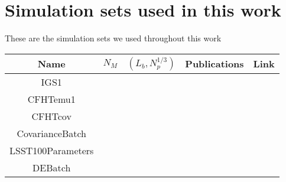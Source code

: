 \appendixpage
\noappendicestocpagenum
\addappheadtotoc

\chapter{Simulation sets used in this work}

These are the simulation sets we used throughout this work

\begin{table}
\begin{center}
\begin{tabular}[t]{c|c|c|c|c}

\textbf{Name} & $N_M$ & $(L_b,N_p^{1/3})$ & \textbf{Publications} & \textbf{Link} \\ \hline \hline
IGS1 & & & \citep{PetriMink,PetriSpShear,MinkJan} & \\ \hline
CFHTemu1 & & & \citep{PetriCFHTMink,PetriCFHTPeaks} & \\ \hline
CFHTcov & & & \citep{PetriCFHTMink,PetriCFHTPeaks} & \\ \hline
CovarianceBatch & & & \citep{PetriVariance} & \\ \hline
LSST100Parameters & & & \citep{PetriPhotoZ} & \\ \hline
DEBatch & & & \citep{PetriBorn} & \\ \hline

\end{tabular}
\end{center}
\end{table}

%